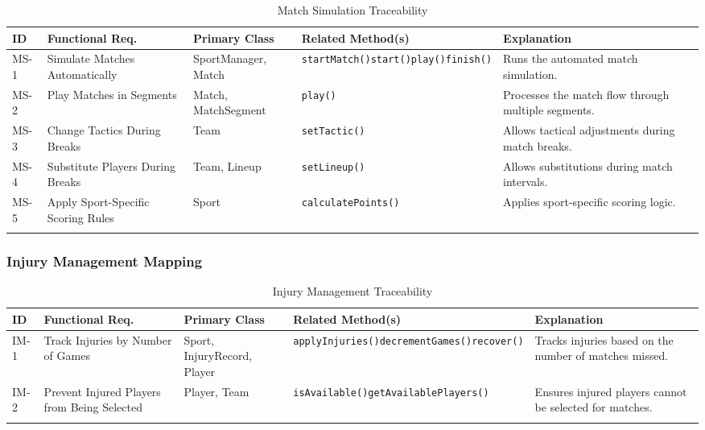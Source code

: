 \documentclass[12pt, a4paper]{article}
\begin{document}
{\footnotesize
\begin{longtable}{L{0.9cm} L{2.0cm} L{2.1cm} L{5.0cm} L{3.5cm}}
\toprule
\textbf{ID} & \textbf{Functional Req.} & \textbf{Primary Class} & \textbf{Related Method(s)} & \textbf{Explanation} \\
\midrule
\endhead
MS-1 & Simulate Matches Automatically & SportManager, Match & \texttt{startMatch()}\newline\texttt{start()}\newline\texttt{play()}\newline\texttt{finish()} & Runs the automated match simulation. \\[0.4em]
MS-2 & Play Matches in Segments & Match, MatchSegment     & \texttt{play()}            & Processes the match flow through multiple segments. \\[0.4em]
MS-3 & Change Tactics During Breaks & Team                 & \texttt{setTactic()}       & Allows tactical adjustments during match breaks. \\[0.4em]
MS-4 & Substitute Players During Breaks & Team, Lineup     & \texttt{setLineup()}       & Allows substitutions during match intervals. \\[0.4em]
MS-5 & Apply Sport-Specific Scoring Rules & Sport          & \texttt{calculatePoints()} & Applies sport-specific scoring logic. \\
\bottomrule
\caption{Match Simulation Traceability}
\end{longtable}
}

\subsubsection*{Injury Management Mapping}

{\footnotesize
\begin{longtable}{L{0.9cm} L{2.0cm} L{2.1cm} L{5.0cm} L{3.5cm}}
\toprule
\textbf{ID} & \textbf{Functional Req.} & \textbf{Primary Class} & \textbf{Related Method(s)} & \textbf{Explanation} \\
\midrule
\endhead
IM-1 & Track Injuries by Number of Games & Sport, InjuryRecord, Player & \texttt{applyInjuries()}\newline\texttt{decrementGames()}\newline\texttt{recover()} & Tracks injuries based on the number of matches missed. \\[0.4em]
IM-2 & Prevent Injured Players from Being Selected & Player, Team & \texttt{isAvailable()}\newline\texttt{getAvailablePlayers()} & Ensures injured players cannot be selected for matches. \\
\bottomrule
\caption{Injury Management Traceability}
\end{longtable}
}
\end{document}
